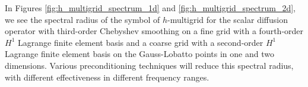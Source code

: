 In Figures \ref{fig:h_multigrid_spectrum_1d} and \ref{fig:h_multigrid_spectrum_2d}, we see the spectral radius of the symbol of $h$-multigrid for the scalar diffusion operator with third-order Chebyshev smoothing on a fine grid with a fourth-order $H^1$ Lagrange finite element basis and a coarse grid with a second-order $H^1$ Lagrange finite element basis on the Gauss-Lobatto points in one and two dimensions.
Various preconditioning techniques will reduce this spectral radius, with different effectiveness in different frequency ranges.
